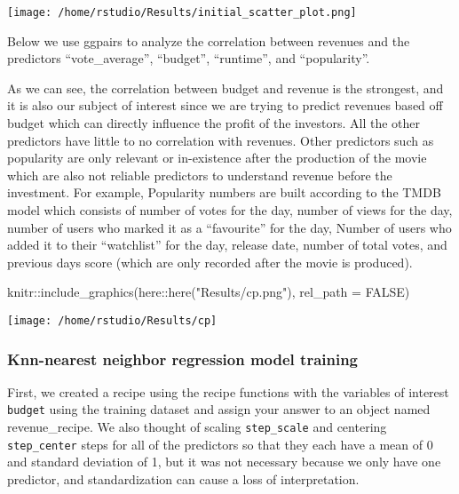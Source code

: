 \documentclass[
]{article}
\newenvironment{Shaded}{\begin{snugshade}}{\end{snugshade}}
\newcommand{\AttributeTok}[1]{\textcolor[rgb]{0.77,0.63,0.00}{#1}}
\newcommand{\ConstantTok}[1]{\textcolor[rgb]{0.00,0.00,0.00}{#1}}
\newcommand{\FunctionTok}[1]{\textcolor[rgb]{0.00,0.00,0.00}{#1}}
\newcommand{\NormalTok}[1]{#1}
\newcommand{\SpecialCharTok}[1]{\textcolor[rgb]{0.00,0.00,0.00}{#1}}
\newcommand{\StringTok}[1]{\textcolor[rgb]{0.31,0.60,0.02}{#1}}
\begin{document}
\texttt{[image: /home/rstudio/Results/initial\_scatter\_plot.png]}

Below we use ggpairs to analyze the correlation between revenues and the predictors ``vote\_average'', ``budget'', ``runtime'', and ``popularity''.

As we can see, the correlation between budget and revenue is the strongest, and it is also our subject of interest since we are trying to predict revenues based off budget which can directly influence the profit of the investors. All the other predictors have little to no correlation with revenues. Other predictors such as popularity are only relevant or in-existence after the production of the movie which are also not reliable predictors to understand revenue before the investment. For example, Popularity numbers are built according to the TMDB model which consists of number of votes for the day, number of views for the day, number of users who marked it as a ``favourite'' for the day, Number of users who added it to their ``watchlist'' for the day, release date, number of total votes, and previous days score (which are only recorded after the movie is produced).

\begin{Shaded}
\begin{Highlighting}[]
\NormalTok{ knitr}\SpecialCharTok{::}\FunctionTok{include\_graphics}\NormalTok{(here}\SpecialCharTok{::}\FunctionTok{here}\NormalTok{(}\StringTok{"Results/cp.png"}\NormalTok{), }\AttributeTok{rel\_path =} \ConstantTok{FALSE}\NormalTok{)}
\end{Highlighting}
\end{Shaded}

\texttt{[image: /home/rstudio/Results/cp]}

\hypertarget{knn-nearest-neighbor-regression-model-training}{%
\subsubsection{Knn-nearest neighbor regression model training}\label{knn-nearest-neighbor-regression-model-training}}

First, we created a recipe using the recipe functions with the variables of interest \texttt{budget} using the training dataset and assign your answer to an object named revenue\_recipe. We also thought of scaling \texttt{step\_scale} and centering \texttt{step\_center} steps for all of the predictors so that they each have a mean of 0 and standard deviation of 1, but it was not necessary because we only have one predictor, and standardization can cause a loss of interpretation.
\end{document}
